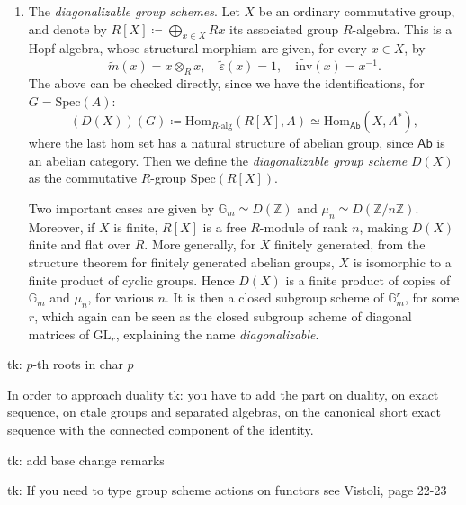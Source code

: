 \documentclass[../Main]{subfiles}
\begin{document}
\begin{ex}
\begin{enumerate}
		\item The {\em diagonalizable group schemes}. Let $X$ be an ordinary
			commutative group, and denote by $R[X] \coloneqq \bigoplus_{x \in X} Rx$
			its associated group $R$-algebra.
			This is a Hopf algebra, whose structural morphism
			are given, for every $x \in X$, by
			\begin{equation}
				\widetilde{m}(x) = x \otimes_R x,
				\quad
				\widetilde{\varepsilon}(x) = 1,
				\quad
				\widetilde{\mathrm{inv}}(x) = x^{-1}
			.\end{equation} 
			The above can be checked directly, since we have
			the identifications, for $G = \mathrm{Spec}(A)$:
			\begin{equation}
				\left( D(X) \right)(G) \coloneqq
				\mathrm{Hom}_{R \text{-alg}} \left( R[X], A \right) \simeq
				\mathrm{Hom}_{\mathsf{Ab}} \left( X, A^* \right)
			,\end{equation} 
			where the last hom set has a natural structure of abelian
			group, since $\mathsf{Ab}$ is an abelian category.
			Then we define the {\em diagonalizable group scheme} $D(X)$
			as the commutative $R$-group $\mathrm{Spec}(R[X])$.

			Two important cases are given by $\mathbb{G}_m \simeq D(\mathbb{Z})$
			and $\mu_n \simeq D(\mathbb{Z}/n\mathbb{Z})$.
			Moreover, if $X$ is finite, $R[X]$ is a free $R$-module of rank $n$,
			making $D(X)$ finite and flat over $R$.
			More generally, for $X$ finitely generated, 
			from the structure theorem for finitely generated abelian groups, 
			$X$ is isomorphic to a finite product of cyclic groups.
			Hence $D(X)$ is a finite product of copies of $\mathbb{G}_m$
			and $\mu_n$, for various $n$.
			It is then a closed subgroup scheme of $\mathbb{G}_m^r$, for some $r$,
			which again can be seen as the closed subgroup scheme of diagonal
			matrices of $\mathrm{GL}_r$, explaining the name 
			{\em diagonalizable}.
	\end{enumerate}
	tk: $p$-th roots in char $p$
\end{ex}

In order to approach duality
tk: you have to add the part on duality, on exact sequence, on etale groups and separated algebras,
on the canonical short exact sequence with the connected component of the identity.

tk: add base change remarks

tk: If you need to type group scheme actions on functors see Vistoli, page 22-23
\end{document}
